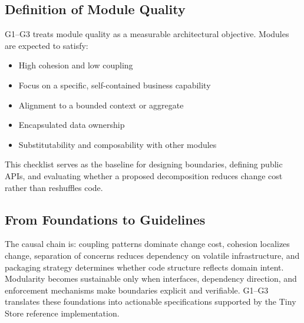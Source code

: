 \subsection*{Definition of Module Quality}

G1--G3 treats module quality as a measurable architectural objective. Modules are expected to satisfy:

\begin{itemize}
    \item High cohesion and low coupling
    \item Focus on a specific, self-contained business capability
    \item Alignment to a bounded context or aggregate
    \item Encapsulated data ownership
    \item Substitutability and composability with other modules
\end{itemize}

This checklist serves as the baseline for designing boundaries, defining public APIs, and evaluating whether a proposed decomposition reduces change cost rather than reshuffles code.

\subsection*{From Foundations to Guidelines}

The causal chain is: coupling patterns dominate change cost, cohesion localizes change, separation of concerns reduces dependency on volatile infrastructure, and packaging strategy determines whether code structure reflects domain intent. Modularity becomes sustainable only when interfaces, dependency direction, and enforcement mechanisms make boundaries explicit and verifiable. G1--G3 translates these foundations into actionable specifications supported by the Tiny Store reference implementation.
